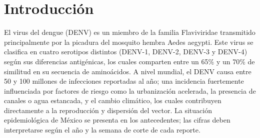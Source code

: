 \titleformat{\chapter}[display]
  {\normalfont\bfseries}{}{0pt}{\Large} %
\chapter*{Introducción}
{}
El virus del dengue (DENV) es un miembro de la familia Flaviviridae transmitido principalmente por la picadura del mosquito hembra Aedes aegypti. Este virus se clasifica en cuatro serotipos distintos (DENV-1, DENV-2, DENV-3 y DENV-4) según sus diferencias antigénicas, los cuales comparten entre un 65\% y un 70\% de similitud en su secuencia de aminoácidos. A nivel mundial, el DENV causa entre 50 y 100 millones de infecciones reportadas al año; una incidencia fuertemente influenciada por factores de riesgo como la urbanización acelerada, la presencia de canales o agua estancada, y el cambio climático, los cuales contribuyen directamente a la reproducción y dispersión del vector. La situación epidemiológica de México se presenta en los antecedentes; las cifras deben interpretarse según el año y la semana de corte de cada reporte.
